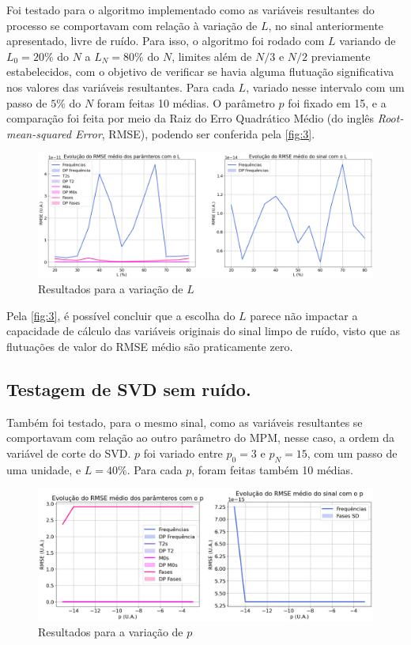\documentclass[12pt]{article}
\begin{document}
Foi testado para o algoritmo implementado como as variáveis resultantes do processo se comportavam com relação à variação de $L$, no sinal 
anteriormente apresentado, livre de ruído. Para isso, o algoritmo foi rodado com $L$ variando de $L_0 = 20\%$ do $N$ a $L_N = 80\%$ do $N$, 
limites além de $N/3$ e $N/2$ previamente estabelecidos, com o objetivo de verificar se havia alguma flutuação significativa nos valores das 
variáveis resultantes. Para cada $L$, variado nesse intervalo com um passo de $5\%$ do $N$ foram feitas 10 médias. O parâmetro $p$ foi fixado 
em 15, e a comparação foi feita por meio da Raiz do Erro Quadrático Médio (do inglês \textit{Root-mean-squared Error}, RMSE), podendo ser 
conferida pela \autoref{fig:3}.

\begin{figure} [H]
    \centering
    \includegraphics[scale=0.3125]{RMSE-L.png}
    \caption{Resultados para a variação de $L$}
    \label{fig:3}
\end{figure}

Pela \autoref{fig:3}, é possível concluir que a escolha do $L$ parece não impactar a capacidade de cálculo das variáveis originais do sinal 
limpo de ruído, visto que as flutuações de valor do RMSE médio são praticamente zero.

\subsection{Testagem de SVD sem ruído.}

Também foi testado, para o mesmo sinal, como as variáveis resultantes se comportavam com relação ao outro parâmetro do MPM, nesse caso, a 
ordem da variável de corte do SVD. $p$ foi variado entre $p_0 = 3$ e $p_N = 15$, com um passo de uma unidade, e $L = 40\%$. Para cada $p$, foram feitas 
também 10 médias. 

\begin{figure} [H]
    \centering
    \includegraphics[scale=0.4166]{RMSE-p.png}
    \caption{Resultados para a variação de $p$}
    \label{fig:4}
\end{figure}
\end{document}
